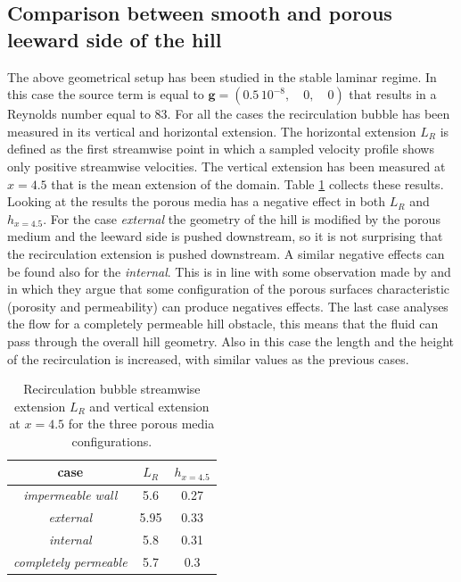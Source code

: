 \subsection{Comparison between smooth and porous leeward side of the hill}

The above geometrical setup has been studied in the stable laminar regime. In this case the source term is equal to $\mathbf{g} = (0.5 \,10^{-8}, \quad0, \quad0)$ that results in a Reynolds number equal to $83$.
For all the cases the recirculation bubble has been measured in its vertical and horizontal extension. The horizontal extension $L_R$ is defined as the first streamwise point in which a sampled velocity profile shows only positive streamwise velocities. The vertical extension has been measured at $x=4.5$ that is the mean extension of the domain.
Table \ref{tb:bubble} collects these results. Looking at the results the porous media has a negative effect in both $L_R$ and $h_{x=4.5}$. For the case \textit{external} the geometry of the hill is modified by the porous medium and the leeward side is pushed downstream, so it is not surprising that the recirculation extension is pushed downstream. A similar negative effects can be found also for the \textit{internal}. This is in line with some observation made by \citet{jimenez2001turbulent} and \citet{segura2017permeable} in which they argue that some configuration of the porous surfaces characteristic (porosity and permeability) can produce negatives effects. The last case analyses the flow for a completely permeable hill obstacle, this means that the fluid can pass through the overall hill geometry. Also in this case the length and the height of the recirculation is increased, with similar values as the previous cases.
\begin{table}[h]
	\centering
	\begin{tabular}{c|c|c}
		case & $L_R$ & $h_{x=4.5}$ \\ 
		\hline 
		\hline 
		\textit{impermeable wall} & 5.6 & 0.27 \\ 
		\hline 
		\textit{external} & 5.95 & 0.33 \\ 
		\hline 
		\textit{internal} & 5.8 & 0.31 \\ 
		\hline 
		\textit{completely permeable} & 5.7 & 0.3 \\ 
		\hline 
		\hline 
	\end{tabular}
	\caption{Recirculation bubble streamwise extension $L_R$ and vertical extension at $x=4.5$ for the three porous media configurations.}
	\label{tb:bubble}
\end{table}

